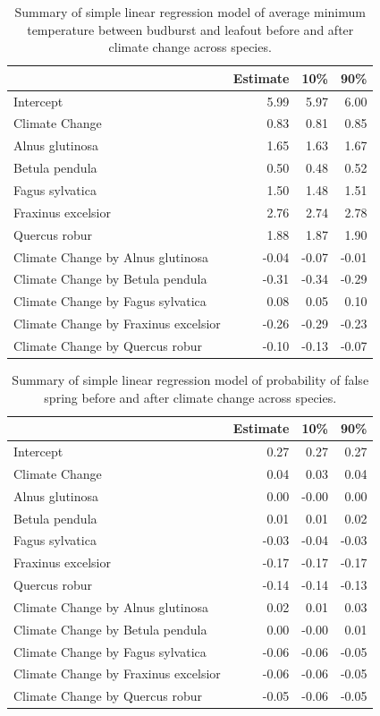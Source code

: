 \documentclass{article}\usepackage[]{graphicx}\usepackage[]{color}
\begin{document}
\begin{table}[H]
\centering
\caption{Summary of simple linear regression model of average minimum temperature between budburst and leafout before and after climate change across species.} 
\begin{tabular}{lrrr}
  \hline
 & Estimate & 10\% & 90\% \\ 
  \hline
Intercept & 5.99 & 5.97 & 6.00 \\ 
  Climate Change & 0.83 & 0.81 & 0.85 \\ 
  Alnus glutinosa & 1.65 & 1.63 & 1.67 \\ 
  Betula pendula & 0.50 & 0.48 & 0.52 \\ 
  Fagus sylvatica & 1.50 & 1.48 & 1.51 \\ 
  Fraxinus excelsior & 2.76 & 2.74 & 2.78 \\ 
  Quercus robur & 1.88 & 1.87 & 1.90 \\ 
  Climate Change by Alnus glutinosa & -0.04 & -0.07 & -0.01 \\ 
  Climate Change by Betula pendula & -0.31 & -0.34 & -0.29 \\ 
  Climate Change by Fagus sylvatica & 0.08 & 0.05 & 0.10 \\ 
  Climate Change by Fraxinus excelsior & -0.26 & -0.29 & -0.23 \\ 
  Climate Change by Quercus robur & -0.10 & -0.13 & -0.07 \\ 
   \hline
\end{tabular}
\end{table}
\begin{table}[H]
\centering
\caption{Summary of simple linear regression model of probability of false spring before and after climate change across species.} 
\begin{tabular}{lrrr}
  \hline
 & Estimate & 10\% & 90\% \\ 
  \hline
Intercept & 0.27 & 0.27 & 0.27 \\ 
  Climate Change & 0.04 & 0.03 & 0.04 \\ 
  Alnus glutinosa & 0.00 & -0.00 & 0.00 \\ 
  Betula pendula & 0.01 & 0.01 & 0.02 \\ 
  Fagus sylvatica & -0.03 & -0.04 & -0.03 \\ 
  Fraxinus excelsior & -0.17 & -0.17 & -0.17 \\ 
  Quercus robur & -0.14 & -0.14 & -0.13 \\ 
  Climate Change by Alnus glutinosa & 0.02 & 0.01 & 0.03 \\ 
  Climate Change by Betula pendula & 0.00 & -0.00 & 0.01 \\ 
  Climate Change by Fagus sylvatica & -0.06 & -0.06 & -0.05 \\ 
  Climate Change by Fraxinus excelsior & -0.06 & -0.06 & -0.05 \\ 
  Climate Change by Quercus robur & -0.05 & -0.06 & -0.05 \\ 
   \hline
\end{tabular}
\end{table}
\end{document}
